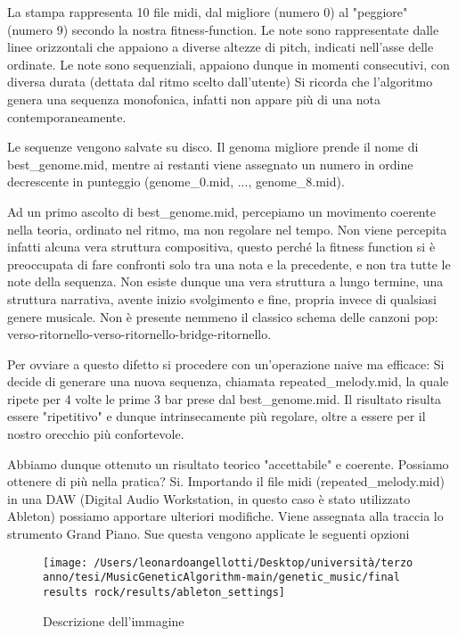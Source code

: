 \documentclass[a4paper,12pt]{report}
\begin{document}
La stampa rappresenta 10 file midi, dal migliore (numero 0) al "peggiore" (numero 9) secondo la nostra fitness-function.
Le note sono rappresentate dalle linee orizzontali che appaiono a diverse altezze di pitch, indicati nell'asse delle ordinate.
Le note sono sequenziali, appaiono dunque in momenti consecutivi, con diversa durata (dettata dal ritmo scelto dall'utente)
Si ricorda che l'algoritmo genera una sequenza monofonica, infatti non appare più di una nota contemporaneamente.

Le sequenze vengono salvate su disco. 
Il genoma migliore prende il nome di best_genome.mid, mentre ai restanti viene assegnato un numero in ordine decrescente in punteggio (genome_0.mid, ..., genome_8.mid).

Ad un primo ascolto di best_genome.mid, percepiamo un movimento coerente nella teoria, ordinato nel ritmo, ma non regolare nel tempo. 
Non viene percepita infatti alcuna vera struttura compositiva, questo perché la fitness function si è preoccupata di fare confronti solo tra una nota e la precedente, e non tra tutte le note della sequenza.
Non esiste dunque una vera struttura a lungo termine, una struttura narrativa, avente inizio svolgimento e fine, propria invece di qualsiasi genere musicale.
Non è presente nemmeno il classico schema delle canzoni pop: verso-ritornello-verso-ritornello-bridge-ritornello.

Per ovviare a questo difetto si procedere con un'operazione naive ma efficace:
Si decide di generare una nuova sequenza, chiamata repeated_melody.mid, la quale ripete per 4 volte le prime 3 bar prese dal best_genome.mid.
Il risultato risulta essere "ripetitivo" e dunque intrinsecamente più regolare, oltre a essere per il nostro orecchio più confortevole.

Abbiamo dunque ottenuto un risultato teorico "accettabile" e coerente. 
Possiamo ottenere di più nella pratica?
Si.
Importando il file midi (repeated_melody.mid) in una DAW (Digital Audio Workstation, in questo caso è stato utilizzato Ableton) possiamo apportare ulteriori modifiche.
Viene assegnata alla traccia lo strumento Grand Piano. 
Sue questa vengono applicate le seguenti opzioni

\begin{figure}[h!]
    \centering
    \texttt{[image: /Users/leonardoangellotti/Desktop/università/terzo anno/tesi/MusicGeneticAlgorithm-main/genetic\_music/final results rock/results/ableton\_settings]} 
    \caption{Descrizione dell'immagine}
    \label{fig:immagine}
\end{figure}
\end{document}
